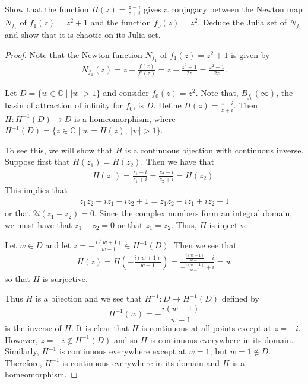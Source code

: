 \begin{problem}{4}
  Show that the function $\displaystyle H(z) = \frac{z-i}{z+i}$ gives a conjugacy between
  the Newton map $N_{f_1}$ of $f_1(z) = z^2 + 1$ and the function $f_0(z) = z^2$. Deduce
  the Julia set of $N_{f_1}$ and show that it is chaotic on its Julia set.
\end{problem}

\begin{proof}
  Note that the Newton function $N_{f_1}$ of $f_1(z) = z^2 + 1$
  is given by
  \begin{align*}
    N_{f_1}(z) = z - \frac{f(z)}{f'(z)} = z - \frac{z^2+1}{2z} = \frac{z^2 - 1}{2z}.
  \end{align*}

  Let $D = \{ w \in \mathbb{C} \mid |w| > 1 \}$ and consider $f_0(z) = z^2$. Note
  that, $B_{f_0}(\infty)$, the basin of attraction of infinity for $f_0$, is $D$.
  Define $\displaystyle H(z) = \frac{z-i}{z+i}$. Then $H: H^{-1}(D) \to D$ is a homeomorphism,
  where $H^{-1}(D) = \{z\in\mathbb{C} \mid w = H(z),\ |w| > 1\}$.

  To see this, we will show that $H$ is a continuous
  bijection with continuous inverse. Suppose first that $H(z_1) = H(z_2)$. Then we have that
  \begin{align*}
    H(z_1) = \frac{z_1 - i}{z_1 + i} = \frac{z_2 - i}{z_2 + i} = H(z_2).
  \end{align*}
  This implies that
  \begin{align*}
    z_1 z_2 + i z_1 - i z_2 + 1 = z_1 z_2 -i z_1 + i z_2 + 1
  \end{align*}
  or that $2i(z_1 - z_2) = 0$. Since the complex numbers form an integral domain, we must
  have that $z_1 - z_2 = 0$ or that $z_1 = z_2$. Thus, $H$ is injective.

  Let $w\in D$ and let $\displaystyle z = - \frac{i(w+1)}{w-1} \in H^{-1}(D)$. Then we see that
  \begin{align*}
    H(z) = H\left(- \frac{i(w+1)}{w-1}\right) = \frac{- \frac{i(w+1)}{w-1} - i}{- \frac{i(w+1)}{w-1} + i} =  w
  \end{align*}
  so that $H$ is surjective.

  Thus $H$ is a bijection and we see that $H^{-1}: D \to H^{-1}(D)$ defined by
  $$H^{-1}(w) = - \frac{i(w+1)}{w-1}$$
  is the inverse of $H$. It is clear that $H$ is continuous at all points except at
  $z=-i$. However, $z=-i\notin H^{-1}(D)$ and so $H$ is continuous everywhere in its domain.
  Similarly, $H^{-1}$ is continuous everywhere except at $w=1$, but $w=1\notin D$. Therefore,
  $H^{-1}$ is continuous everywhere in its domain and $H$ is a homeomorphism.


\end{proof}
